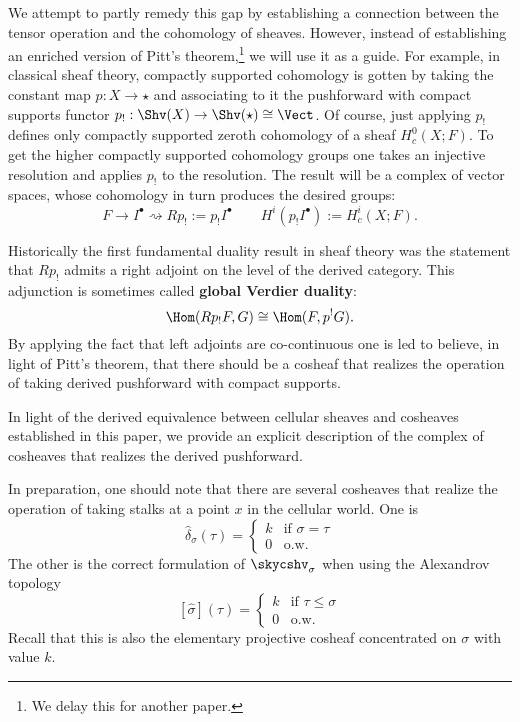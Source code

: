 We attempt to partly remedy this gap by establishing a connection between the tensor operation and the cohomology of sheaves. However, instead of establishing an enriched version of Pitt's theorem,\footnote{We delay this for another paper.} we will use it as a guide. For example, in classical sheaf theory, compactly supported cohomology is gotten by taking the constant map $p:X\to\star$ and associating to it the pushforward with compact supports functor $p_!:\Shv(X)\to\Shv(\star)\cong\Vect$. Of course, just applying $p_!$ defines only compactly supported zeroth cohomology of a sheaf $H_c^0(X;F)$. To get the higher compactly supported cohomology groups one takes an injective resolution and applies $p_!$ to the resolution. The result will be a complex of vector spaces, whose cohomology in turn produces the desired groups:
\[
	F\to I^{\bullet} \rightsquigarrow Rp_!:=p_! I^{\bullet} \qquad H^i(p_! I^{\bullet}):= H^i_c(X;F).
\] 

Historically the first fundamental duality result in sheaf theory was the statement that $Rp_!$ admits a right adjoint on the level of the derived category. This adjunction is sometimes called \textbf{global Verdier duality}:
\[
	\Hom(Rp_!F,G)\cong \Hom(F,p^!G).
\]
By applying the fact that left adjoints are co-continuous one is led to believe, in light of Pitt's theorem, that there should be a cosheaf that realizes the operation of taking derived pushforward with compact supports.

In light of the derived equivalence between cellular sheaves and cosheaves established in this paper, we provide an explicit description of the complex of cosheaves that realizes the derived pushforward.

In preparation, one should note that there are several cosheaves that realize the operation of taking stalks at a point $x$ in the cellular world. One is
\[
  \hat{\delta}_{\sigma}(\tau)=\left\{ \begin{array}{ll} k & \textrm{if $\sigma=\tau$}\\
	0 & \textrm{o.w.}\end{array} \right.
\]
The other is the correct formulation of $\skycshv_{\sigma}$ when using the Alexandrov topology
\[
  [\hat{\sigma}](\tau)=\left\{ \begin{array}{ll} k & \textrm{if $\tau\leq\sigma$}\\
	0 & \textrm{o.w.}\end{array} \right.
\]
Recall that this is also the elementary projective cosheaf concentrated on $\sigma$ with value $k$.

